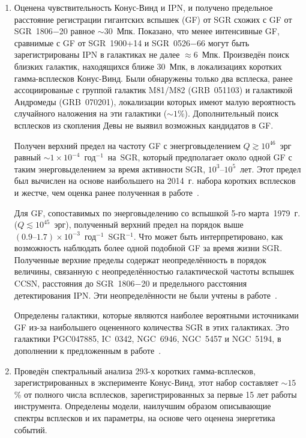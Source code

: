 \begin{enumerate}
\item Оценена чувствительность Конус-Винд и IPN, и получено 
    предельное расстояние регистрации гигантских вспышек (GF) от SGR схожих с GF от SGR~1806$-$20 
    равное $\sim 30$~Мпк. Показано, что менее интенсивные GF, сравнимые 
    с GF от SGR~1900+14 и SGR~0526$-$66 могут быть зарегистрированы IPN в галактиках 
    не далее $\approx 6$~Мпк.
    Произведён поиск близких галактик, находящихся ближе 30~Мпк, в локализациях 
    коротких гамма-всплесков Конус-Винд. Были обнаружены только два всплеска, ранее 
    ассоциированые с группой галактик M81/M82 (GRB~051103) и галактикой Андромеды (GRB~070201),
    локализации которых имеют малую вероятность случайного наложения на эти галактики ($\sim 1$\%).
    Дополнительный поиск всплесков из скопления Девы не выявил возможных кандидатов в GF.
    
    Получен верхний предел на частоту GF с энегрговыделением $Q \gtrsim 10^{46}$~эрг равный
    $\sim 1 \times 10^{-4}$~год$^{-1}$~на~SGR, который предполагает 
    около одной GF с таким энерговыделением за время активности SGR, $10^3\textrm{--}10^5$~лет. 
    Этот предел был вычислен на основе наибольшего на 2014~г.  
    набора коротких всплесков и жестче, чем оценка ранее полученная в работе~\citep{Ofek_2007ApJ}.
    
    Для GF, сопоставимых по энерговыделению со вспышкой 5-го марта~1979~г. ($Q \lesssim 10^{45}$~эрг), 
    полученный верхний предел на порядок выше $(0.9\textrm{--}1.7)\times 10^{-3}$~год$^{-1}$~SGR$^{-1}$. 
    Что может быть интерпретировано, как возможность наблюдать более одной подобной GF за время жизни SGR.
    Полученные верхние пределы содержат неопределённость в порядок величины, связанную с
    неопределённостью галактической частоты вспышек CCSN, расстояния до SGR~1806$-$20 и
    предельного расстояния детектирования IPN. Эти неопределённости не были учтены в работе~\citep{Ofek_2007ApJ}.
    
    Определены галактики, которые являются наиболее вероятными источниками GF 
    из-за наибольшего оцененного количества SGR в этих галактиках. Это галактики
    PGC047885, IC~0342, NGC~6946, NGC~5457 и NGC~5194, в дополнении к предложенным 
    в работе~\citep{Popov2006}.
  
\item Проведён спектральный анализа 293-х коротких гамма-всплесков,
    зарегистрированных в эксперименте Конус-Винд, этот набор составляет $\sim 15$\% 
    от полного числа всплесков, зарегистрированных за первые 15 лет работы инструмента.
    Определены модели, наилучшим образом описывающие спектры всплесков и их параметры,
    на основе чего оценена энергетика событий. 
    

\end{enumerate}
